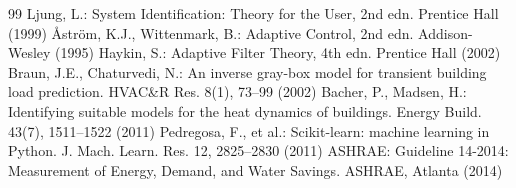 \documentclass{svproc}
\begin{document}
\begin{thebibliography}{99}
 Ljung, L.: System Identification: Theory for the User, 2nd edn. Prentice Hall (1999)
 {\AA}str\"om, K.J., Wittenmark, B.: Adaptive Control, 2nd edn. Addison-Wesley (1995)
 Haykin, S.: Adaptive Filter Theory, 4th edn. Prentice Hall (2002)
 Braun, J.E., Chaturvedi, N.: An inverse gray-box model for transient building load prediction. HVAC\&R Res. 8(1), 73--99 (2002)
 Bacher, P., Madsen, H.: Identifying suitable models for the heat dynamics of buildings. Energy Build. 43(7), 1511--1522 (2011)
 Pedregosa, F., et al.: Scikit-learn: machine learning in Python. J. Mach. Learn. Res. 12, 2825--2830 (2011)
 ASHRAE: Guideline 14-2014: Measurement of Energy, Demand, and Water Savings. ASHRAE, Atlanta (2014)
\end{thebibliography}
\end{document}
